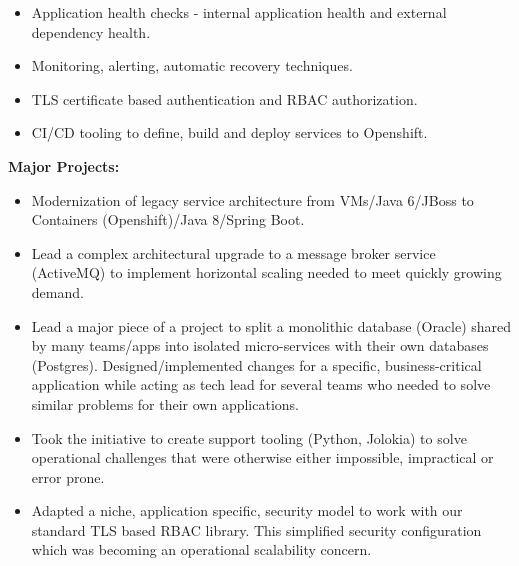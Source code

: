 \begin{entrylist}
{\begin{itemize}
\begin{itemize}
    \item Application health checks - internal application health and external dependency health.
    \item Monitoring, alerting, automatic recovery techniques.
    \item TLS certificate based authentication and RBAC authorization.
    \item CI/CD tooling to define, build and deploy services to Openshift.
  \end{itemize}
\end{itemize}
\textbf{Major Projects:}
\begin{itemize}
\item Modernization of legacy service architecture from VMs/Java 6/JBoss to Containers (Openshift)/Java 8/Spring Boot.
\item Lead a complex architectural upgrade to a message broker service (ActiveMQ) to implement horizontal scaling needed to meet quickly growing demand.
\item Lead a major piece of a project to split a monolithic database (Oracle) shared by many teams/apps into isolated micro-services with their own databases (Postgres). Designed/implemented changes for a specific, business-critical application while acting as tech lead for several teams who needed to solve similar problems for their own applications.
\item Took the initiative to create support tooling (Python, Jolokia) to solve operational challenges that were otherwise either impossible, impractical or error prone.
\item Adapted a niche, application specific, security model to work with our standard TLS based RBAC library. This simplified security configuration which was becoming an operational scalability concern.
\end{itemize}
}


\end{entrylist}
